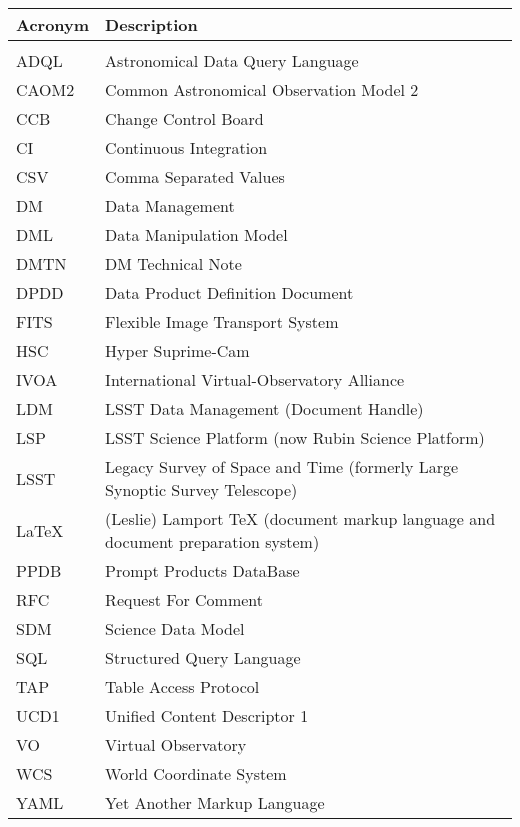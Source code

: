 \addtocounter{table}{-1}
\begin{longtable}{p{}p{}}\hline
\textbf{Acronym} & \textbf{Description}  \\\hline

 &  \\\hline
ADQL & Astronomical Data Query Language \\\hline
CAOM2 & Common Astronomical Observation Model 2 \\\hline
CCB & Change Control Board \\\hline
CI & Continuous Integration \\\hline
CSV & Comma Separated Values \\\hline
DM & Data Management \\\hline
DML & Data Manipulation Model \\\hline
DMTN & DM Technical Note \\\hline
DPDD & Data Product Definition Document \\\hline
FITS & Flexible Image Transport System \\\hline
HSC & Hyper Suprime-Cam \\\hline
IVOA & International Virtual-Observatory Alliance \\\hline
LDM & LSST Data Management (Document Handle) \\\hline
LSP & LSST Science Platform (now Rubin Science Platform) \\\hline
LSST & Legacy Survey of Space and Time (formerly Large Synoptic Survey Telescope) \\\hline
LaTeX & (Leslie) Lamport TeX (document markup language and document preparation system) \\\hline
PPDB & Prompt Products DataBase \\\hline
RFC & Request For Comment \\\hline
SDM & Science Data Model \\\hline
SQL & Structured Query Language \\\hline
TAP & Table Access Protocol \\\hline
UCD1 & Unified Content Descriptor 1 \\\hline
VO & Virtual Observatory \\\hline
WCS & World Coordinate System \\\hline
YAML & Yet Another Markup Language \\\hline
\end{longtable}
